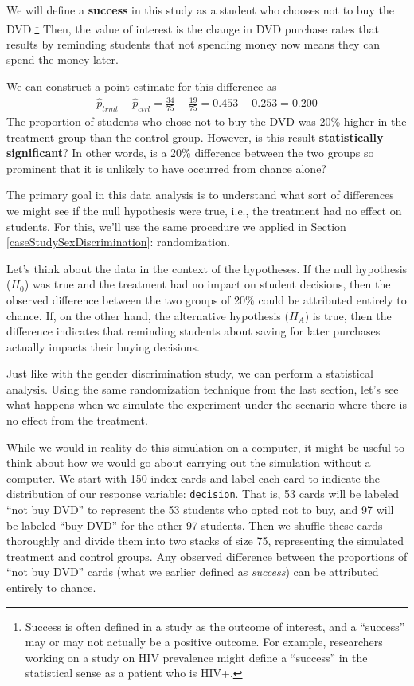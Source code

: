 \documentclass[
  10pt,
  openany]{book}
\theoremstyle{definition}
\theoremstyle{definition}
\theoremstyle{definition}
\theoremstyle{definition}
\theoremstyle{remark}
\begin{document}
We will define a \textbf{success} in this study as a student who chooses not to buy the DVD.\footnote{Success is often defined in a study as the outcome of interest, and a ``success'' may or may not actually be a positive outcome. For example, researchers working on a study on HIV prevalence might define a ``success'' in the statistical sense as a patient who is HIV+.} Then, the value of interest is the change in DVD purchase rates that results by reminding students that not spending money now means they can spend the money later.

We can construct a point estimate for this difference as \begin{align*}
\hat{p}_{trmt} - \hat{p}_{ctrl}
 = \frac{34}{75} - \frac{19}{75}
 = 0.453 - 0.253
 = 0.200
\end{align*} The proportion of students who chose not to buy the DVD was 20\% higher in the treatment group than the control group. However, is this result \textbf{statistically significant}? In other words, is a 20\% difference between the two groups so prominent that it is unlikely to have occurred from chance alone?

The primary goal in this data analysis is to understand what sort of differences we might see if the null hypothesis were true, i.e., the treatment had no effect on students. For this, we'll use the same procedure we applied in Section \ref{caseStudySexDiscrimination}: randomization.

Let's think about the data in the context of the hypotheses. If the null hypothesis (\(H_0\)) was true and the treatment had no impact on student decisions, then the observed difference between the two groups of 20\% could be attributed entirely to chance. If, on the other hand, the alternative hypothesis (\(H_A\)) is true, then the difference indicates that reminding students about saving for later purchases actually impacts their buying decisions.

Just like with the gender discrimination study, we can perform a statistical analysis. Using the same randomization technique from the last section, let's see what happens when we simulate the experiment under the scenario where there is no effect from the treatment.

While we would in reality do this simulation on a computer, it might be useful to think about how we would go about carrying out the simulation without a computer. We start with 150 index cards and label each card to indicate the distribution of our response variable: \texttt{decision}. That is, 53 cards will be labeled ``not buy DVD'' to represent the 53 students who opted not to buy, and 97 will be labeled ``buy DVD'' for the other 97 students. Then we shuffle these cards thoroughly and divide them into two stacks of size 75, representing the simulated treatment and control groups. Any observed difference between the proportions of ``not buy DVD'' cards (what we earlier defined as \emph{success}) can be attributed entirely to chance.
\end{document}

